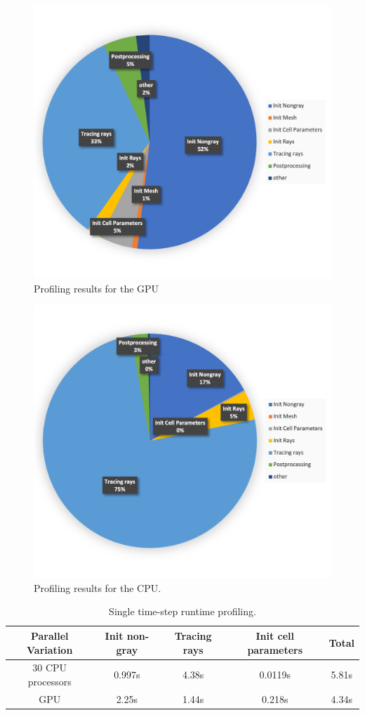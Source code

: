 \begin{figure}
\centering
\includegraphics[width=0.675\linewidth]{figures/ch4/PoolFire_profiling_OnetimestepGPU.png}
\caption{Profiling results for the GPU}
\label{fig:PoolFire_profiling}
\end{figure}

\begin{figure}
\centering
\includegraphics[width=0.675\linewidth]{figures/ch4/PoolFire_profiling_OnetimestepCPU.png}
\caption{Profiling results for the CPU.}
\label{fig:PoolFire_profiling_CPU}
\end{figure}

\begin{table}[h!]
\centering
\caption{Single time-step runtime profiling.}
\begin{tabular}{||c c c c c||} 
 \hline
 Parallel Variation & Init non-gray & Tracing rays & Init cell parameters & Total \\ [0.5ex] 
 \hline\hline
 30 CPU processors & 0.997s & 4.38s & 0.0119s & 5.81s \\
 GPU & 2.25s & 1.44s & 0.218s & 4.34s \\ 
 \hline
\end{tabular}
\label{table:PoolFireTimestep_runtime_table_1rpc}
\end{table}

